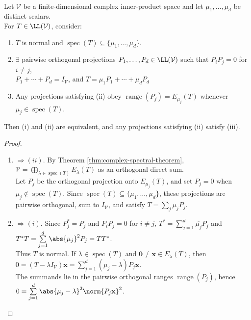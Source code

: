 \begin{theorem} \label{thm:spectral-resolution-normal-operator} \\
Let $\mathcal{V}$ be a finite-dimensional complex inner-product space and let $\mu_1,\ldots,\mu_d$ be distinct scalars.\\
For $T\in\LL(\mathcal{V})$, consider:
\begin{enumerate}[label=(\roman*)]
\setlength{\itemsep}{0pt}
\item $T$ is normal and $\operatorname{spec}(T)\subseteq\{\mu_1,\ldots,\mu_d\}$.
\item $\exists$ pairwise orthogonal projections $P_1,\ldots,P_d\in\LL(\mathcal{V})$ such that $P_iP_j=0$ for $i\neq j$,\\
$P_1+\cdots+P_d=I_{\mathcal{V}}$, and $T=\mu_1P_1+\cdots+\mu_dP_d$
\item Any projections satisfying (ii) obey $\operatorname{range}(P_j)=E_{\mu_j}(T)$ whenever $\mu_j\in\operatorname{spec}(T)$.
\end{enumerate}
Then (i) and (ii) are equivalent, and any projections satisfying (ii) satisfy (iii).
\begin{proof}
\begin{enumerate}[label=(\roman*).]
\setlength{\itemsep}{0pt}
\item[$(i)$]$\Rightarrow (ii)$. By Theorem \ref{thm:complex-spectral-theorem}, $\mathcal{V}=\bigoplus\limits_{\lambda\in\operatorname{spec}(T)}E_{\lambda}(T)$ as an orthogonal direct sum.\\
Let $P_j$ be the orthogonal projection onto $E_{\mu_j}(T)$, and set $P_j=0$ when $\mu_j\notin\operatorname{spec}(T)$. Since $\operatorname{spec}(T)\subseteq\{\mu_1,\ldots,\mu_d\}$, these projections are pairwise orthogonal, sum to $I_{\mathcal{V}}$, and satisfy $T=\sum_j\mu_jP_j$.
\item[$(ii)$]$\Rightarrow (i)$. Since $P_j^*=P_j$ and $P_iP_j=0$ for $i\neq j$, $T^*=\sum\limits_{j=1}^{d}\overline{\mu_j}P_j$ and $T^*T=\sum\limits_{j=1}^{d}\abs{\mu_j}^2P_j=TT^*$.\\
Thus $T$ is normal. If $\lambda\in\operatorname{spec}(T)$ and $\mathbf{0}\neq\mathbf{x}\in E_{\lambda}(T)$, then $0=(T-\lambda I_{\mathcal{V}})\mathbf{x} =\sum\limits_{j=1}^{d}(\mu_j-\lambda)P_j\mathbf{x}$.\\
The summands lie in the pairwise orthogonal ranges $\operatorname{range}(P_j)$, hence $0=\sum\limits_{j=1}^{d}\abs{\mu_j-\lambda}^2\norm{P_j\mathbf{x}}^2$.\\

\end{enumerate}
\end{proof}
\end{theorem}
